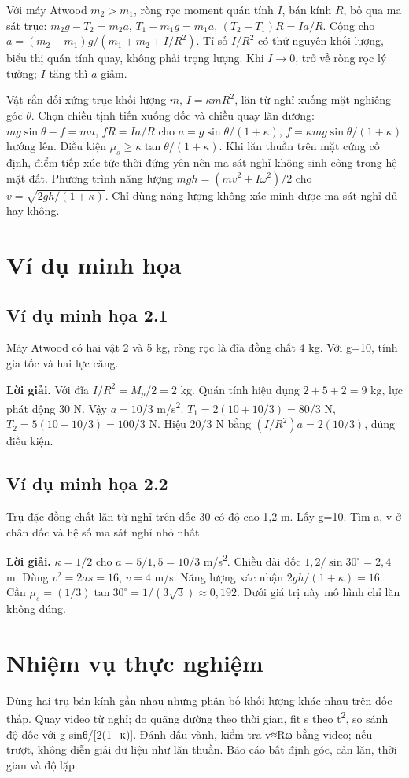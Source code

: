 \documentclass[11pt,a4paper,openany]{book}
\begin{document}
Với máy Atwood $m_2>m_1$, ròng rọc moment quán tính $I$, bán kính $R$, bỏ qua ma sát trục: $m_2g-T_2=m_2a$, $T_1-m_1g=m_1a$, $(T_2-T_1)R=I a/R$. Cộng cho $a=(m_2-m_1)g/(m_1+m_2+I/R^2)$. Tỉ số $I/R^2$ có thứ nguyên khối lượng, biểu thị quán tính quay, không phải trọng lượng. Khi $I\to0$, trở về ròng rọc lý tưởng; $I$ tăng thì $a$ giảm.

Vật rắn đối xứng trục khối lượng $m$, $I=\kappa mR^2$, lăn từ nghỉ xuống mặt nghiêng góc $\theta$. Chọn chiều tịnh tiến xuống dốc và chiều quay lăn dương: $mg\sin\theta-f=ma$, $fR=I a/R$ cho $a=g\sin\theta/(1+\kappa)$, $f=\kappa mg\sin\theta/(1+\kappa)$ hướng lên. Điều kiện $\mu_s\ge\kappa\tan\theta/(1+\kappa)$. Khi lăn thuần trên mặt cứng cố định, điểm tiếp xúc tức thời đứng yên nên ma sát nghỉ không sinh công trong hệ mặt đất. Phương trình năng lượng $mgh=(mv^2+I\omega^2)/2$ cho $v=\sqrt{2gh/(1+\kappa)}$. Chỉ dùng năng lượng không xác minh được ma sát nghỉ đủ hay không.

\section{Ví dụ minh họa}
\subsection*{Ví dụ minh họa 2.1}
Máy Atwood có hai vật 2 và 5 kg, ròng rọc là đĩa đồng chất 4 kg. Với g=10, tính gia tốc và hai lực căng.

\textbf{Lời giải.} Với đĩa $I/R^2=M_p/2=2$ kg. Quán tính hiệu dụng $2+5+2=9$ kg, lực phát động 30 N. Vậy $a=10/3$ m/s\textsuperscript{2}. $T_1=2(10+10/3)=80/3$ N, $T_2=5(10-10/3)=100/3$ N. Hiệu $20/3$ N bằng $(I/R^2)a=2(10/3)$, đúng điều kiện.
\subsection*{Ví dụ minh họa 2.2}
Trụ đặc đồng chất lăn từ nghỉ trên dốc 30\textdegree{} có độ cao 1,2 m. Lấy g=10. Tìm a, v ở chân dốc và hệ số ma sát nghỉ nhỏ nhất.

\textbf{Lời giải.} $\kappa=1/2$ cho $a=5/1{,}5=10/3$ m/s\textsuperscript{2}. Chiều dài dốc $1{,}2/\sin30^\circ=2{,}4$ m. Dùng $v^2=2as=16$, $v=4$ m/s. Năng lượng xác nhận $2gh/(1+\kappa)=16$. Cần $\mu_s=(1/3)\tan30^\circ=1/(3\sqrt3)\approx0{,}192$. Dưới giá trị này mô hình chỉ lăn không đúng.
\section{Nhiệm vụ thực nghiệm}
Dùng hai trụ bán kính gần nhau nhưng phân bố khối lượng khác nhau trên dốc thấp. Quay video từ nghỉ; đo quãng đường theo thời gian, fit s theo t\textsuperscript{2}, so sánh độ dốc với g sinθ/[2(1+κ)]. Đánh dấu vành, kiểm tra v≈Rω bằng video; nếu trượt, không diễn giải dữ liệu như lăn thuần. Báo cáo bất định góc, cản lăn, thời gian và độ lặp.
\end{document}
